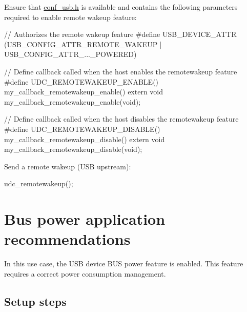 \begin{DoxyEnumerate}
\item Ensure that \hyperlink{conf__usb_8h}{conf\-\_\-usb.\-h} is available and contains the following parameters required to enable remote wakeup feature\-:
\begin{DoxyItemize}
\item 
\begin{DoxyCode}
 \textcolor{comment}{// Authorizes the remote wakeup feature}
\textcolor{preprocessor}{             #define  USB\_DEVICE\_ATTR (USB\_CONFIG\_ATTR\_REMOTE\_WAKEUP |
       USB\_CONFIG\_ATTR\_...\_POWERED) }
\end{DoxyCode}

\item 
\begin{DoxyCode}
 \textcolor{comment}{// Define callback called when the host enables the remotewakeup feature}
\textcolor{preprocessor}{        #define UDC\_REMOTEWAKEUP\_ENABLE() my\_callback\_remotewakeup\_enable()}
\textcolor{preprocessor}{        extern void my\_callback\_remotewakeup\_enable(void); }
\end{DoxyCode}

\item 
\begin{DoxyCode}
 \textcolor{comment}{// Define callback called when the host disables the remotewakeup feature}
\textcolor{preprocessor}{        #define UDC\_REMOTEWAKEUP\_DISABLE() my\_callback\_remotewakeup\_disable()}
\textcolor{preprocessor}{        extern void my\_callback\_remotewakeup\_disable(void); }
\end{DoxyCode}

\end{DoxyItemize}
\item Send a remote wakeup (U\-S\-B upstream)\-:
\begin{DoxyItemize}
\item 
\begin{DoxyCode}
 udc\_remotewakeup(); 
\end{DoxyCode}
 
\end{DoxyItemize}
\end{DoxyEnumerate}\hypertarget{udc_use_case_5}{}\section{Bus power application recommendations}\label{udc_use_case_5}
In this use case, the U\-S\-B device B\-U\-S power feature is enabled. This feature requires a correct power consumption management.\hypertarget{udc_use_case_5_udc_use_case_5_setup}{}\subsection{Setup steps}\label{udc_use_case_5_udc_use_case_5_setup}
